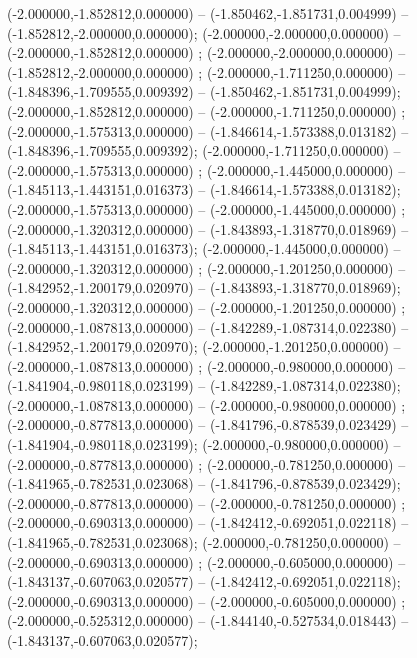  (-2.000000,-1.852812,0.000000) -- (-1.850462,-1.851731,0.004999) -- (-1.852812,-2.000000,0.000000);
 (-2.000000,-2.000000,0.000000) -- (-2.000000,-1.852812,0.000000) ;
 (-2.000000,-2.000000,0.000000) -- (-1.852812,-2.000000,0.000000) ;
 (-2.000000,-1.711250,0.000000) -- (-1.848396,-1.709555,0.009392) -- (-1.850462,-1.851731,0.004999);
 (-2.000000,-1.852812,0.000000) -- (-2.000000,-1.711250,0.000000) ;
 (-2.000000,-1.575313,0.000000) -- (-1.846614,-1.573388,0.013182) -- (-1.848396,-1.709555,0.009392);
 (-2.000000,-1.711250,0.000000) -- (-2.000000,-1.575313,0.000000) ;
 (-2.000000,-1.445000,0.000000) -- (-1.845113,-1.443151,0.016373) -- (-1.846614,-1.573388,0.013182);
 (-2.000000,-1.575313,0.000000) -- (-2.000000,-1.445000,0.000000) ;
 (-2.000000,-1.320312,0.000000) -- (-1.843893,-1.318770,0.018969) -- (-1.845113,-1.443151,0.016373);
 (-2.000000,-1.445000,0.000000) -- (-2.000000,-1.320312,0.000000) ;
 (-2.000000,-1.201250,0.000000) -- (-1.842952,-1.200179,0.020970) -- (-1.843893,-1.318770,0.018969);
 (-2.000000,-1.320312,0.000000) -- (-2.000000,-1.201250,0.000000) ;
 (-2.000000,-1.087813,0.000000) -- (-1.842289,-1.087314,0.022380) -- (-1.842952,-1.200179,0.020970);
 (-2.000000,-1.201250,0.000000) -- (-2.000000,-1.087813,0.000000) ;
 (-2.000000,-0.980000,0.000000) -- (-1.841904,-0.980118,0.023199) -- (-1.842289,-1.087314,0.022380);
 (-2.000000,-1.087813,0.000000) -- (-2.000000,-0.980000,0.000000) ;
 (-2.000000,-0.877813,0.000000) -- (-1.841796,-0.878539,0.023429) -- (-1.841904,-0.980118,0.023199);
 (-2.000000,-0.980000,0.000000) -- (-2.000000,-0.877813,0.000000) ;
 (-2.000000,-0.781250,0.000000) -- (-1.841965,-0.782531,0.023068) -- (-1.841796,-0.878539,0.023429);
 (-2.000000,-0.877813,0.000000) -- (-2.000000,-0.781250,0.000000) ;
 (-2.000000,-0.690313,0.000000) -- (-1.842412,-0.692051,0.022118) -- (-1.841965,-0.782531,0.023068);
 (-2.000000,-0.781250,0.000000) -- (-2.000000,-0.690313,0.000000) ;
 (-2.000000,-0.605000,0.000000) -- (-1.843137,-0.607063,0.020577) -- (-1.842412,-0.692051,0.022118);
 (-2.000000,-0.690313,0.000000) -- (-2.000000,-0.605000,0.000000) ;
 (-2.000000,-0.525312,0.000000) -- (-1.844140,-0.527534,0.018443) -- (-1.843137,-0.607063,0.020577);
